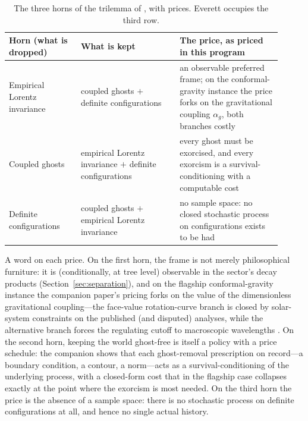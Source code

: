 \documentclass[11pt]{article}
\theoremstyle{remark}
\begin{document}
\begin{table}[ht]
\centering
\small
\begin{tabular}{@{}p{0.24\linewidth}p{0.33\linewidth}p{0.34\linewidth}@{}}
\toprule
\textbf{Horn (what is dropped)} & \textbf{What is kept} & \textbf{The price, as priced in this program}\\
\midrule
Empirical Lorentz invariance & coupled ghosts $+$ definite
configurations & an observable preferred frame; on the
conformal-gravity instance the price forks on the gravitational
coupling $\alpha_g$, both branches costly \cite{choosing}\\[4pt]
Coupled ghosts & empirical Lorentz invariance $+$ definite
configurations & every ghost must be exorcised, and every exorcism is
a survival-conditioning with a computable cost \cite{exorcised}\\[4pt]
Definite configurations & coupled ghosts $+$ empirical Lorentz
invariance & no sample space: no closed stochastic process on
configurations exists to be had \cite{choosing}\\
\bottomrule
\end{tabular}
\caption{The three horns of the trilemma of
\cite{instantaneous,choosing}, with prices. Everett occupies the
third row.}
\label{tab:horns}
\end{table}

A word on each price. On the first horn, the frame is not merely
philosophical furniture: it is (conditionally, at tree level)
observable in the sector's decay
products (Section~\ref{sec:separation}), and on the flagship
conformal-gravity instance the companion paper's pricing forks on the
value of the dimensionless gravitational coupling---the face-value
rotation-curve branch is closed by solar-system constraints on the
published (and disputed) analyses, while the alternative branch
forces the regulating cutoff to macroscopic wavelengths
\cite{choosing}. On the second horn, keeping the world ghost-free is
itself a policy with a price schedule: the companion
\cite{exorcised} shows that each ghost-removal prescription on
record---a boundary condition, a contour, a norm---acts as a
survival-conditioning of the underlying process, with a closed-form
cost that in the flagship case collapses exactly at the point where
the exorcism is most needed. On the third horn the price is the
absence of a sample space: there is no stochastic process on definite
configurations at all, and hence no single actual history.
\end{document}
